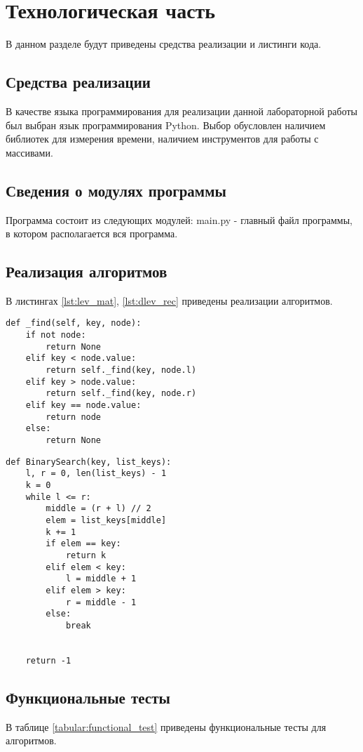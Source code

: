 \chapter{Технологическая часть}

В данном разделе будут приведены средства реализации и листинги кода.


\section{Средства реализации}

В качестве языка программирования для реализации данной лабораторной работы был выбран язык программирования Python. Выбор обусловлен наличием библиотек для измерения времени, наличием инструментов для работы с массивами.


\section{Сведения о модулях программы}
Программа состоит из следующих модулей:
main.py - главный файл программы, в котором располагается вся программа.


\section{Реализация алгоритмов}

В листингах \ref{lst:lev_mat}, \ref{lst:dlev_rec} приведены реализации алгоритмов.
\newpage
\begin{lstlisting}[label=lst:lev_mat,caption= Поиск в AVL-дереве.]
def _find(self, key, node):
	if not node:
		return None
	elif key < node.value:    
		return self._find(key, node.l)
	elif key > node.value:
		return self._find(key, node.r)
	elif key == node.value:
		return node
	else:
		return None
\end{lstlisting}
\newpage
\begin{lstlisting}[label=lst:dlev_rec,caption= Бинарный поиск.]
def BinarySearch(key, list_keys):
	l, r = 0, len(list_keys) - 1
	k = 0
	while l <= r:
		middle = (r + l) // 2
		elem = list_keys[middle]
		k += 1
		if elem == key:
			return k
		elif elem < key:
			l = middle + 1
		elif elem > key:
			r = middle - 1
		else:
			break
		
	
	return -1
\end{lstlisting}
\newpage
\section{Функциональные тесты}
В таблице \ref{tabular:functional_test} приведены функциональные тесты для алгоритмов.


